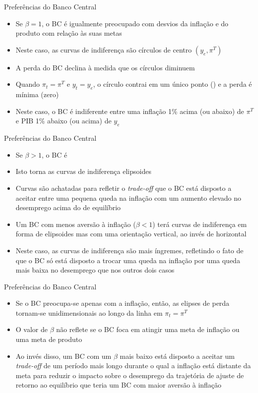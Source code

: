 \documentclass[10pt]{beamer}
\begin{document}
\begin{frame}
    {Preferências do Banco Central}
    \begin{itemize}
        \item Se $\beta = 1$, o BC é igualmente preocupado com desvios da inflação e do produto com relação às suas metas\bigskip
        \item Neste caso, as curvas de indiferença são círculos de centro $(y_e, \pi^T)$\bigskip
        \item A perda do BC declina à medida que os círculos diminuem\bigskip
        \item Quando $\pi_t = \pi^T$ e $y_t = y_e$, o círculo contrai em um único ponto () e a perda é mínima (zero)\bigskip
        \item Neste caso, o BC é indiferente entre uma inflação 1\% acima (ou abaixo) de $\pi^T$ e PIB 1\% abaixo (ou acima) de $y_e$
    \end{itemize}
\end{frame}

\begin{frame}
    {Preferências do Banco Central}
    \begin{itemize}
        \item Se $\beta > 1$, o BC é \bigskip
        \item Isto torna as curvas de indiferença elipsoides\bigskip
        \item Curvas são achatadas para refletir o \emph{trade-off} que o BC está disposto a aceitar entre uma pequena queda na inflação com um aumento elevado no desemprego acima do de equilíbrio\bigskip
        \item Um BC com menos aversão à inflação ($\beta < 1$) terá curvas de indiferença em forma de elipsoides mas com uma orientação vertical, ao invés de horizontal\bigskip
        \item Neste caso, as curvas de indiferença são mais íngremes, refletindo o fato de que o BC só está disposto a trocar uma queda na inflação por uma queda mais baixa no desemprego que nos outros dois casos
    \end{itemize}
\end{frame}

\begin{frame}
    {Preferências do Banco Central}
    \begin{itemize}
        \item Se o BC preocupa-se apenas com a inflação, então, as elipses de perda tornam-se unidimensionais ao longo da linha em $\pi_t = \pi^T$\bigskip
        \item O valor de $\beta$ não reflete se o BC foca em atingir uma meta de inflação ou uma meta de produto\bigskip
        \item Ao invés disso, um BC com um $\beta$ mais baixo está disposto a aceitar um \emph{trade-off} de um período mais longo durante o qual a inflação está distante da meta para reduzir o impacto sobre o desemprego da trajetória de ajuste de retorno ao equilíbrio que teria um BC com maior aversão à inflação
    \end{itemize}
\end{frame}
\end{document}
